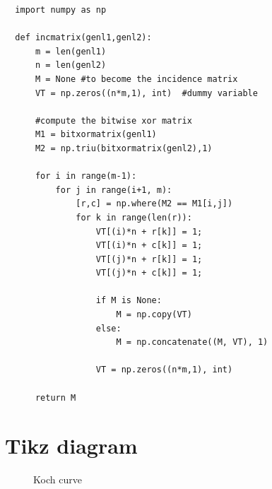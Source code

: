 \documentclass{article}
\begin{document}
  \begin{verbatim}
  import numpy as np

  def incmatrix(genl1,genl2):
      m = len(genl1)
      n = len(genl2)
      M = None #to become the incidence matrix
      VT = np.zeros((n*m,1), int)  #dummy variable

      #compute the bitwise xor matrix
      M1 = bitxormatrix(genl1)
      M2 = np.triu(bitxormatrix(genl2),1)

      for i in range(m-1):
          for j in range(i+1, m):
              [r,c] = np.where(M2 == M1[i,j])
              for k in range(len(r)):
                  VT[(i)*n + r[k]] = 1;
                  VT[(i)*n + c[k]] = 1;
                  VT[(j)*n + r[k]] = 1;
                  VT[(j)*n + c[k]] = 1;

                  if M is None:
                      M = np.copy(VT)
                  else:
                      M = np.concatenate((M, VT), 1)

                  VT = np.zeros((n*m,1), int)

      return M
  \end{verbatim}

  \section{Tikz diagram}

  \begin{figure}[htbp!]
    \centering
    \begin{adjustbox}{max width=\textwidth}
    \end{adjustbox}
    \caption{Koch curve~\cite{koch}}
  \end{figure}

  
  
\end{document}
